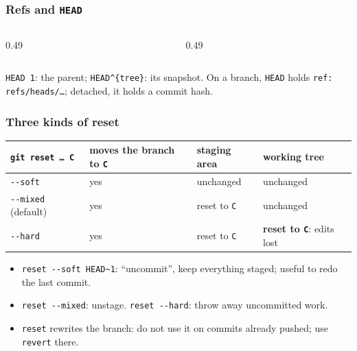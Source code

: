 \documentclass[aspectratio=169,10pt,compress]{beamer}
\begin{document}
\begin{frame}[t,fragile] \frametitle{Refs and \texttt{HEAD}}
  \begin{columns}[T]
    \begin{column}{0.49\textwidth}
    \end{column}
    \begin{column}{0.49\textwidth}
    \end{column}
  \end{columns}

  \vspace{0.1em}
  \small
  \texttt{HEAD~1}: the parent; \texttt{HEAD\textasciicircum\{tree\}}: its snapshot. On a branch, \texttt{HEAD} holds \texttt{ref: refs/heads/\dots};
  detached, it holds a commit hash.
\end{frame}





\begin{frame}[t,fragile] \frametitle{Three kinds of reset}
  \begin{center}\small
  \begin{tabular}{llll}
    \toprule
    \texttt{git reset \dots{} C} & moves the branch to \texttt{C} & staging area & working tree \\
    \midrule
    \texttt{-{}-soft}            & yes                            & unchanged     & unchanged \\
    \texttt{-{}-mixed} (default) & yes                            & reset to \texttt{C} & unchanged \\
    \texttt{-{}-hard}            & yes                            & reset to \texttt{C} & \textbf{reset to \texttt{C}}: edits lost \\
    \bottomrule
  \end{tabular}
  \end{center}
  \vspace{0.3em}
  \begin{itemize}\small
    \item \texttt{reset -{}-soft HEAD\textasciitilde1}: ``uncommit'', keep everything staged; useful to redo the last commit.
    \item \texttt{reset -{}-mixed}: unstage. \texttt{reset -{}-hard}: throw away uncommitted work. 
    \item \texttt{reset} rewrites the branch: do not use it on commits already pushed; use \texttt{revert} there.
  \end{itemize}
\end{frame}
\end{document}
